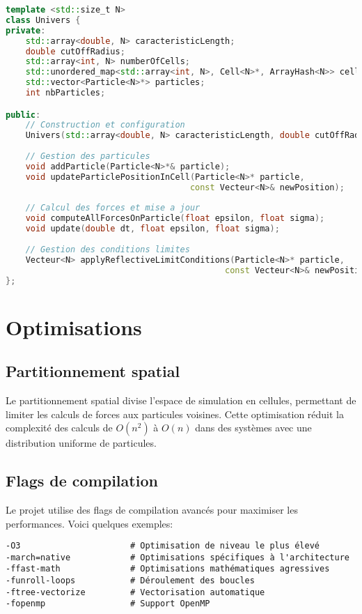\documentclass[12pt,a4paper]{article}
\begin{document}
\begin{lstlisting}[language=C++, caption=Extrait de la classe Univers]
template <std::size_t N>
class Univers {
private:
    std::array<double, N> caracteristicLength;
    double cutOffRadius;
    std::array<int, N> numberOfCells;
    std::unordered_map<std::array<int, N>, Cell<N>*, ArrayHash<N>> cells;
    std::vector<Particle<N>*> particles;
    int nbParticles;

public:
    // Construction et configuration
    Univers(std::array<double, N> caracteristicLength, double cutOffRadius);
    
    // Gestion des particules
    void addParticle(Particle<N>*& particle);
    void updateParticlePositionInCell(Particle<N>* particle, 
                                     const Vecteur<N>& newPosition);
    
    // Calcul des forces et mise a jour
    void computeAllForcesOnParticle(float epsilon, float sigma);
    void update(double dt, float epsilon, float sigma);
    
    // Gestion des conditions limites
    Vecteur<N> applyReflectiveLimitConditions(Particle<N>* particle, 
                                            const Vecteur<N>& newPosition);
};
\end{lstlisting}

\section{Optimisations}

\subsection{Partitionnement spatial}

Le partitionnement spatial divise l'espace de simulation en cellules, permettant de limiter les calculs de forces aux particules voisines. Cette optimisation réduit la complexité des calculs de $O(n^2)$ à $O(n)$ dans des systèmes avec une distribution uniforme de particules.

\subsection{Flags de compilation}

Le projet utilise des flags de compilation avancés pour maximiser les performances. Voici quelques exemples:

\begin{verbatim}
-O3                      # Optimisation de niveau le plus élevé
-march=native            # Optimisations spécifiques à l'architecture
-ffast-math              # Optimisations mathématiques agressives
-funroll-loops           # Déroulement des boucles
-ftree-vectorize         # Vectorisation automatique
-fopenmp                 # Support OpenMP
\end{verbatim}
\end{document}
